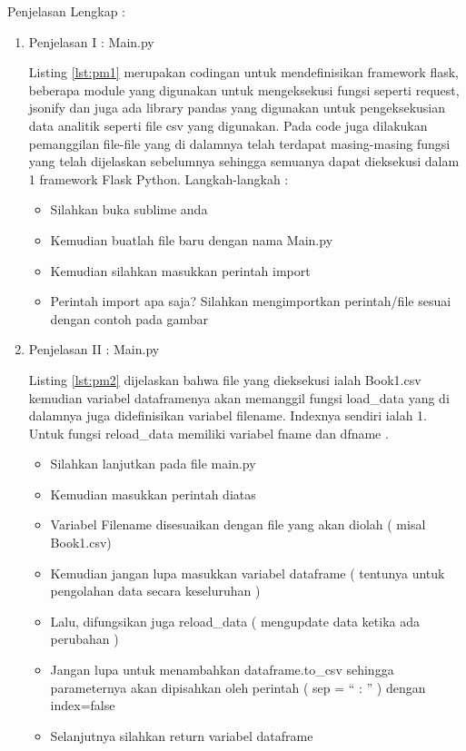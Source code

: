 Penjelasan Lengkap :
\begin{enumerate}
\item Penjelasan I : Main.py


Listing \ref{lst:pm1} merupakan codingan untuk mendefinisikan framework flask, beberapa module yang digunakan untuk mengeksekusi fungsi seperti request, jsonify dan juga ada library pandas yang digunakan untuk pengeksekusian data analitik seperti file csv yang digunakan. Pada code juga dilakukan pemanggilan file-file yang di dalamnya telah terdapat masing-masing fungsi yang telah dijelaskan sebelumnya sehingga semuanya dapat dieksekusi dalam 1 framework Flask Python.
Langkah-langkah :
\begin{itemize}
\item Silahkan buka sublime anda
\item Kemudian buatlah file baru dengan nama Main.py
\item Kemudian silahkan masukkan perintah import
\item Perintah import apa saja? Silahkan mengimportkan perintah/file sesuai dengan contoh pada gambar
\end{itemize}

\item Penjelasan II : Main.py


Listing \ref{lst:pm2}  dijelaskan bahwa file yang dieksekusi ialah Book1.csv kemudian variabel dataframenya akan memanggil fungsi load\_data yang di dalamnya juga didefinisikan variabel filename. Indexnya sendiri ialah 1. Untuk fungsi reload\_data memiliki variabel fname dan dfname .
\begin{itemize}
\item Silahkan lanjutkan pada file main.py
\item Kemudian masukkan perintah diatas
\item Variabel Filename disesuaikan dengan file yang akan diolah ( misal Book1.csv)
\item Kemudian jangan lupa masukkan variabel dataframe ( tentunya untuk pengolahan data secara keseluruhan )
\item Lalu, difungsikan juga reload\_data ( mengupdate data ketika ada perubahan )
\item Jangan lupa untuk menambahkan dataframe.to\_csv sehingga parameternya akan dipisahkan oleh perintah ( sep = “ : ” ) dengan index=false
\item Selanjutnya silahkan return variabel dataframe
\end{itemize}


\end{enumerate}
